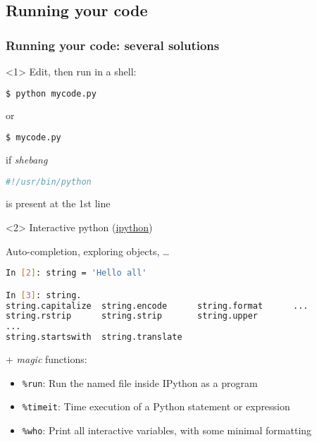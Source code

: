 %
%
%

\subsection{Running your code}
\begin{frame}[fragile, c]
\frametitle{Running your code: several solutions}

\begin{onlyenv}<1> 
Edit, then run in a shell:
\begin{lstlisting}[language=bash]
$ python mycode.py
\end{lstlisting}
or 
\begin{lstlisting}[language=bash]
$ mycode.py
\end{lstlisting}
if \textit{shebang}
\begin{lstlisting}[language=python]
#!/usr/bin/python
\end{lstlisting}
is present at the 1st line
\end{onlyenv}

\begin{onlyenv}<2> 
Interactive python (\href{http://ipython.org/}{ipython})

Auto-completion, exploring objects, \ldots

\begin{lstlisting}[language=bash]
In [2]: string = 'Hello all'

In [3]: string.
string.capitalize  string.encode      string.format      ...
string.rstrip      string.strip       string.upper       
... 
string.startswith  string.translate   
\end{lstlisting}

+ \textit{magic} functions:

{\footnotesize
\begin{itemize}
\item[] \verb|%run|: Run the named file inside IPython as a program\\
\item[] \verb|%timeit|: Time execution of a Python statement or expression\\
\item[] \verb|%who|: Print all interactive variables, with some minimal formatting
\end{itemize}
}
\vfill


\end{onlyenv}
\end{frame}
